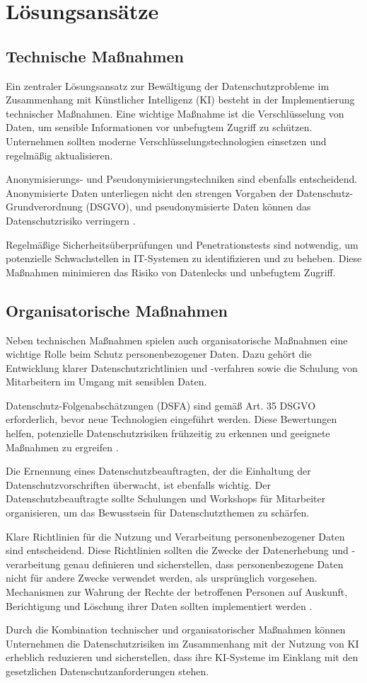 \chapter{Lösungsansätze}

\section{Technische Maßnahmen}
Ein zentraler Lösungsansatz zur Bewältigung der Datenschutzprobleme im
Zusammenhang mit Künstlicher Intelligenz (KI) besteht in der Implementierung
technischer Maßnahmen. Eine wichtige Maßnahme ist die Verschlüsselung von Daten,
um sensible Informationen vor unbefugtem Zugriff zu schützen. Unternehmen
sollten moderne Verschlüsselungstechnologien einsetzen und regelmäßig
aktualisieren.

Anonymisierungs- und Pseudonymisierungstechniken sind ebenfalls entscheidend.
Anonymisierte Daten unterliegen nicht den strengen Vorgaben der
Datenschutz-Grundverordnung (DSGVO), und pseudonymisierte Daten können das
Datenschutzrisiko verringern \cite{conrad_2017}.

Regelmäßige Sicherheitsüberprüfungen und Penetrationstests sind notwendig, um
potenzielle Schwachstellen in IT-Systemen zu identifizieren und zu beheben.
Diese Maßnahmen minimieren das Risiko von Datenlecks und unbefugtem Zugriff.

\section{Organisatorische Maßnahmen}
Neben technischen Maßnahmen spielen auch organisatorische Maßnahmen eine
wichtige Rolle beim Schutz personenbezogener Daten. Dazu gehört die Entwicklung
klarer Datenschutzrichtlinien und -verfahren sowie die Schulung von Mitarbeitern
im Umgang mit sensiblen Daten.

Datenschutz-Folgenabschätzungen (DSFA) sind gemäß Art. 35 DSGVO erforderlich,
bevor neue Technologien eingeführt werden. Diese Bewertungen helfen, potenzielle
Datenschutzrisiken frühzeitig zu erkennen und geeignete Maßnahmen zu ergreifen
\cite{conrad_2017}.

Die Ernennung eines Datenschutzbeauftragten, der die Einhaltung der
Datenschutzvorschriften überwacht, ist ebenfalls wichtig. Der
Datenschutzbeauftragte sollte Schulungen und Workshops für Mitarbeiter
organisieren, um das Bewusstsein für Datenschutzthemen zu schärfen.

Klare Richtlinien für die Nutzung und Verarbeitung personenbezogener Daten sind
entscheidend. Diese Richtlinien sollten die Zwecke der Datenerhebung und
-verarbeitung genau definieren und sicherstellen, dass personenbezogene Daten
nicht für andere Zwecke verwendet werden, als ursprünglich vorgesehen.
Mechanismen zur Wahrung der Rechte der betroffenen Personen auf Auskunft,
Berichtigung und Löschung ihrer Daten sollten implementiert werden
\cite{conrad_2017}.

Durch die Kombination technischer und organisatorischer Maßnahmen können
Unternehmen die Datenschutzrisiken im Zusammenhang mit der Nutzung von KI
erheblich reduzieren und sicherstellen, dass ihre KI-Systeme im Einklang mit den
gesetzlichen Datenschutzanforderungen stehen.

